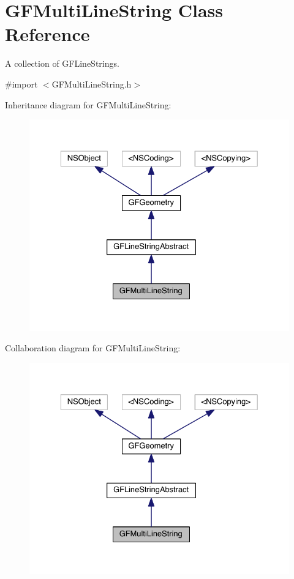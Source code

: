 \hypertarget{interface_g_f_multi_line_string}{}\section{G\+F\+Multi\+Line\+String Class Reference}
\label{interface_g_f_multi_line_string}


A collection of G\+F\+Line\+Strings.  




{\ttfamily \#import $<$G\+F\+Multi\+Line\+String.\+h$>$}



Inheritance diagram for G\+F\+Multi\+Line\+String\+:\nopagebreak
\begin{figure}[H]
\begin{center}
\leavevmode
\includegraphics[width=329pt]{interface_g_f_multi_line_string__inherit__graph}
\end{center}
\end{figure}


Collaboration diagram for G\+F\+Multi\+Line\+String\+:\nopagebreak
\begin{figure}[H]
\begin{center}
\leavevmode
\includegraphics[width=329pt]{interface_g_f_multi_line_string__coll__graph}
\end{center}
\end{figure}
